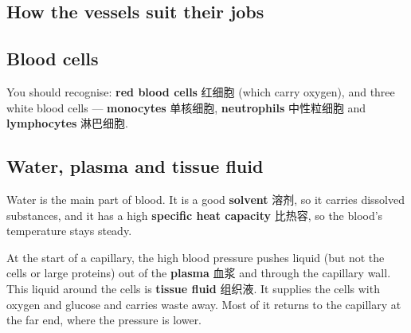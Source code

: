 \documentclass[11pt]{article}
\begin{document}
\subsection*{How the vessels suit their jobs}

\begin{center}
\end{center}

\subsection*{Blood cells}

You should recognise: \textbf{red blood cells} 红细胞 (which carry oxygen), and three white blood cells — \textbf{monocytes} 单核细胞, \textbf{neutrophils} 中性粒细胞 and \textbf{lymphocytes} 淋巴细胞.

\subsection*{Water, plasma and tissue fluid}

Water is the main part of blood. It is a good \textbf{solvent} 溶剂, so it carries dissolved substances, and it has a high \textbf{specific heat capacity} 比热容, so the blood's temperature stays steady.

At the start of a capillary, the high blood pressure pushes liquid (but not the cells or large proteins) out of the \textbf{plasma} 血浆 and through the capillary wall. This liquid around the cells is \textbf{tissue fluid} 组织液. It supplies the cells with oxygen and glucose and carries waste away. Most of it returns to the capillary at the far end, where the pressure is lower.
\end{document}
